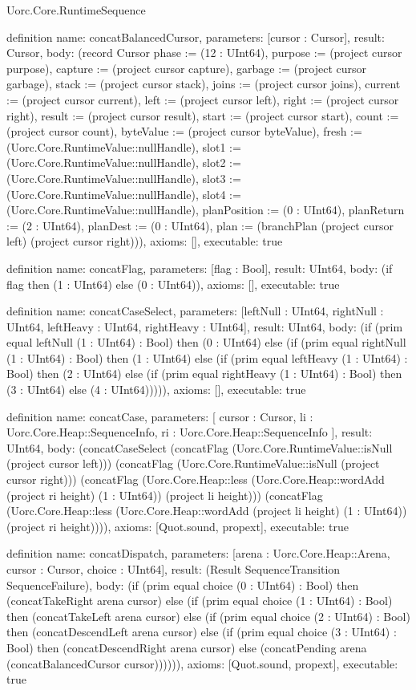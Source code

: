\begin{lexlean}{Uorc.Core.RuntimeSequence}
\begin{semanticmodule}
definition{
  name: concatBalancedCursor,
  parameters: [cursor : Cursor],
  result: Cursor,
  body: (record Cursor {phase := (12 : UInt64), purpose := (project cursor purpose), capture := (project cursor capture), garbage := (project cursor garbage), stack := (project cursor stack), joins := (project cursor joins), current := (project cursor current), left := (project cursor left), right := (project cursor right), result := (project cursor result), start := (project cursor start), count := (project cursor count), byteValue := (project cursor byteValue), fresh := (Uorc.Core.RuntimeValue::nullHandle), slot1 := (Uorc.Core.RuntimeValue::nullHandle), slot2 := (Uorc.Core.RuntimeValue::nullHandle), slot3 := (Uorc.Core.RuntimeValue::nullHandle), slot4 := (Uorc.Core.RuntimeValue::nullHandle), planPosition := (0 : UInt64), planReturn := (2 : UInt64), planDest := (0 : UInt64), plan := (branchPlan (project cursor left) (project cursor right))}),
  axioms: [],
  executable: true
}

definition{
  name: concatFlag,
  parameters: [flag : Bool],
  result: UInt64,
  body: (if flag then (1 : UInt64) else (0 : UInt64)),
  axioms: [],
  executable: true
}

definition{
  name: concatCaseSelect,
  parameters: [leftNull : UInt64, rightNull : UInt64, leftHeavy : UInt64, rightHeavy : UInt64],
  result: UInt64,
  body: (if (prim equal leftNull (1 : UInt64) : Bool) then (0 : UInt64) else (if (prim equal rightNull (1 : UInt64) : Bool) then (1 : UInt64) else (if (prim equal leftHeavy (1 : UInt64) : Bool) then (2 : UInt64) else (if (prim equal rightHeavy (1 : UInt64) : Bool) then (3 : UInt64) else (4 : UInt64))))),
  axioms: [],
  executable: true
}

definition{
  name: concatCase,
  parameters: [
    cursor : Cursor,
    li : Uorc.Core.Heap::SequenceInfo,
    ri : Uorc.Core.Heap::SequenceInfo
  ],
  result: UInt64,
  body: (concatCaseSelect (concatFlag (Uorc.Core.RuntimeValue::isNull (project cursor left))) (concatFlag (Uorc.Core.RuntimeValue::isNull (project cursor right))) (concatFlag (Uorc.Core.Heap::less (Uorc.Core.Heap::wordAdd (project ri height) (1 : UInt64)) (project li height))) (concatFlag (Uorc.Core.Heap::less (Uorc.Core.Heap::wordAdd (project li height) (1 : UInt64)) (project ri height)))),
  axioms: [Quot.sound, propext],
  executable: true
}

definition{
  name: concatDispatch,
  parameters: [arena : Uorc.Core.Heap::Arena, cursor : Cursor, choice : UInt64],
  result: (Result SequenceTransition SequenceFailure),
  body: (if (prim equal choice (0 : UInt64) : Bool) then (concatTakeRight arena cursor) else (if (prim equal choice (1 : UInt64) : Bool) then (concatTakeLeft arena cursor) else (if (prim equal choice (2 : UInt64) : Bool) then (concatDescendLeft arena cursor) else (if (prim equal choice (3 : UInt64) : Bool) then (concatDescendRight arena cursor) else (concatPending arena (concatBalancedCursor cursor)))))),
  axioms: [Quot.sound, propext],
  executable: true
}


\end{semanticmodule}
\end{lexlean}
